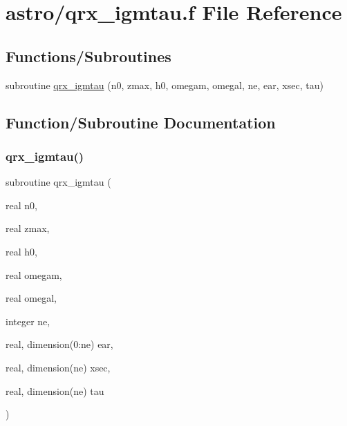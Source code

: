 \hypertarget{qrx__igmtau_8f}{}\section{astro/qrx\+\_\+igmtau.f File Reference}
\label{qrx__igmtau_8f}
\subsection*{Functions/\+Subroutines}
\begin{DoxyCompactItemize}
\item 
subroutine \hyperlink{qrx__igmtau_8f_a8a7aa7eb047d995f088850bb175d6cf5}{qrx\+\_\+igmtau} (n0, zmax, h0, omegam, omegal, ne, ear, xsec, tau)
\end{DoxyCompactItemize}


\subsection{Function/\+Subroutine Documentation}
\mbox{\label{qrx__igmtau_8f_a8a7aa7eb047d995f088850bb175d6cf5}} 
\subsubsection{\texorpdfstring{qrx\+\_\+igmtau()}{qrx\_igmtau()}}
{\footnotesize\ttfamily subroutine qrx\+\_\+igmtau (\begin{DoxyParamCaption}\item[{real}]{n0,  }\item[{real}]{zmax,  }\item[{real}]{h0,  }\item[{real}]{omegam,  }\item[{real}]{omegal,  }\item[{integer}]{ne,  }\item[{real, dimension(0\+:ne)}]{ear,  }\item[{real, dimension(ne)}]{xsec,  }\item[{real, dimension(ne)}]{tau }\end{DoxyParamCaption})}

